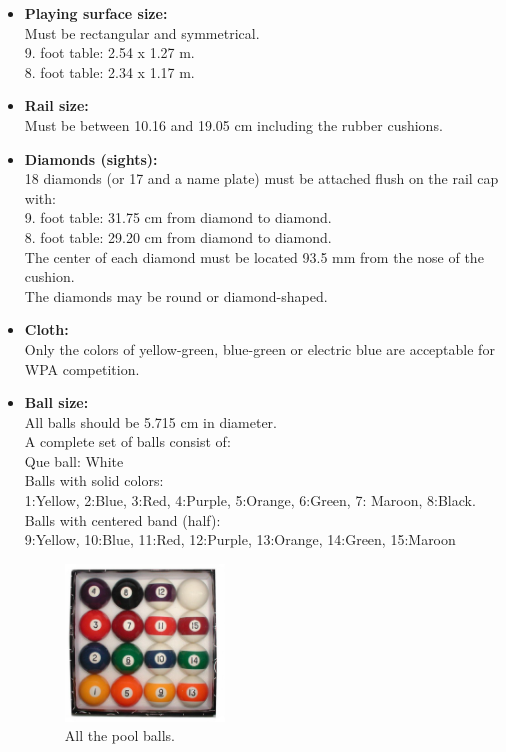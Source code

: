 \begin{itemize}
	\item \textbf{Playing surface size:}\\
		Must be rectangular and symmetrical.\\
		9. foot table: 2.54 x 1.27 m.\\
		8. foot table: 2.34 x 1.17 m.\\
	\item \textbf{Rail size:}\\
		Must be between 10.16 and 19.05 cm including the rubber cushions.\\
	\item \textbf{Diamonds (sights):}\\
		18 diamonds (or 17 and a name plate) must be attached flush on the rail cap with:\\
		9. foot table: 31.75 cm from diamond to diamond.\\
		8. foot table: 29.20 cm from diamond to diamond.\\
		The center of each diamond must be located 93.5 mm from the nose of the cushion.\\
		The diamonds may be round or diamond-shaped.\\
	\item \textbf{Cloth:}\\
		Only the colors of yellow-green, blue-green or electric blue are acceptable for WPA competition. \\
	\item \textbf{Ball size:}\\
		All balls should be 5.715 cm in diameter.\\
		A complete set of balls consist of:\\
		Que ball: White\\
		Balls with solid colors:\\
		\hspace*{10 mm}	1:Yellow, 2:Blue, 3:Red, 4:Purple, 5:Orange, 6:Green, 7: Maroon, 8:Black.\\
		Balls with centered band (half):\\
		\hspace*{10 mm}	9:Yellow, 10:Blue, 11:Red, 12:Purple, 13:Orange, 14:Green, 15:Maroon\\
		
		\begin{figure}[H]
		\begin{center}
		\leavevmode
		\includegraphics[width=0.4\textwidth]{images/poolballs.jpg}
		\end{center}
		\caption{All the pool balls.}
		\label{fig:poolballs}
		\end{figure}	
		

\end{itemize}
